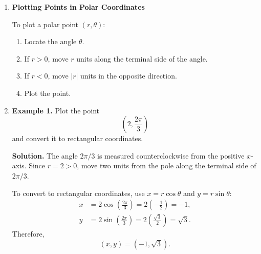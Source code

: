 \documentclass[11pt,letterpaper]{article}
\begin{document}
\begin{enumerate}
\begin{enumerate}
The conversion formulas follow from right-triangle trigonometry:
\[
\boxed{x=r\cos\theta}
\qquad\text{and}\qquad
\boxed{y=r\sin\theta}.
\]
Also,
\[
\boxed{r^2=x^2+y^2}.
\]
When converting from rectangular to polar coordinates, the equation
\[
\tan\theta=\frac{y}{x}
\]
may help determine an angle, but the quadrant of $(x,y)$ must also be considered.

\item \textbf{Polar representations are not unique.}

Adding a complete revolution does not change the point:
\[
(r,\theta)=(r,\theta+2\pi k),\qquad k\in\mathbb Z.
\]
A negative radius reverses the direction by $\pi$ radians:
\[
(r,\theta)=(-r,\theta+\pi).
\]
For example,
\[
\left(2,\frac{\pi}{3}\right)
=\left(2,\frac{7\pi}{3}\right)
=\left(-2,\frac{4\pi}{3}\right).
\]
All three ordered pairs represent the same point.
\end{enumerate}

\begin{notebox}
\textbf{Important:} A polar ordered pair is written $(r,\theta)$. First determine the angle $\theta$; then use the directed radius $r$ to locate the point.
\end{notebox}

\item \textbf{Plotting Points in Polar Coordinates}

To plot a polar point $(r,\theta)$:
\begin{enumerate}[label=\arabic*.,leftmargin=.35in,itemsep=2pt]
\item Locate the angle $\theta$.
\item If $r>0$, move $r$ units along the terminal side of the angle.
\item If $r<0$, move $|r|$ units in the opposite direction.
\item Plot the point.
\end{enumerate}

\item \textbf{Example 1.} Plot the point
\[
\left(2,\frac{2\pi}{3}\right)
\]
and convert it to rectangular coordinates.

\textbf{Solution.} The angle $2\pi/3$ is measured counterclockwise from the positive $x$-axis. Since $r=2>0$, move two units from the pole along the terminal side of $2\pi/3$.

To convert to rectangular coordinates, use $x=r\cos\theta$ and $y=r\sin\theta$:
\begin{align*}
x&=2\cos\left(\frac{2\pi}{3}\right)
  =2\left(-\frac12\right)=-1,\\
y&=2\sin\left(\frac{2\pi}{3}\right)
  =2\left(\frac{\sqrt3}{2}\right)=\sqrt3.
\end{align*}
Therefore,
\[
\boxed{(x,y)=(-1,\sqrt3)}.
\]


\end{enumerate}
\end{document}
